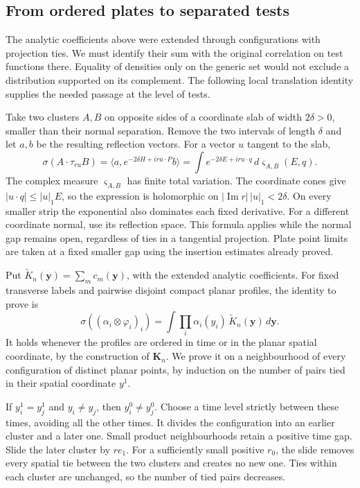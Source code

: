 \documentclass[11pt,letterpaper,reqno]{amsart}
\theoremstyle{definition}
\theoremstyle{remark}
\begin{document}
\subsection{From ordered plates to separated tests}

The analytic coefficients above were extended through configurations
with projection ties. We must identify their sum with the original
correlation on test functions there. Equality of densities only on
the generic set would not exclude a distribution supported on its
complement. The following local translation identity supplies the
needed passage at the level of tests.

Take two clusters $A,B$ on opposite sides of a coordinate slab of
width $2\delta>0$, smaller than their normal separation. Remove the
two intervals of length $\delta$ and let $a,b$ be the resulting
reflection vectors. For a vector $u$ tangent to the slab,
\begin{equation}\label{eq:expanded-slab-sliding}
 \sigma(A\cdot\tau_{ru}B)
 =\langle a,e^{-2\delta H+iru\cdot P}b\rangle
 =\int e^{-2\delta E+iru\cdot q}
                                \,d\varsigma_{A,B}(E,q).
\end{equation}
The complex measure $\varsigma_{A,B}$ has finite total variation.
The coordinate cones give $|u\cdot q|\le |u|_1E$, so the expression
is holomorphic on $|\operatorname{Im}r|\,|u|_1<2\delta$. On every
smaller strip the exponential also dominates each fixed derivative.
For a different coordinate normal, use its reflection space.
This formula applies while the normal gap remains open, regardless
of ties in a tangential projection. Plate point limits are taken at
a fixed smaller gap using the insertion estimates already proved.

Put $\widetilde K_n(\mathbf y)=\sum_m c_m(\mathbf y)$, with the
extended analytic coefficients. For fixed transverse labels and
pairwise disjoint compact planar profiles, the identity to prove is
\[
 \sigma((\alpha_i\otimes\varphi_i)_i)
   =\int\prod_i\alpha_i(y_i)\,
                         \widetilde K_n(\mathbf y)\,d\mathbf y.
\]
It holds whenever the profiles are ordered in time or in the planar
spatial coordinate, by the construction of $\mathbf K_n$. We prove
it on a neighbourhood of every configuration of distinct planar
points, by induction on the number of pairs tied in their spatial
coordinate $y^1$.

If $y_i^1=y_j^1$ and $y_i\ne y_j$, then $y_i^0\ne y_j^0$.
Choose a time level strictly between these times, avoiding all the
other times. It divides the configuration into an earlier cluster
and a later one. Small product neighbourhoods retain a positive
time gap. Slide the later cluster by $re_1$. For a sufficiently
small positive $r_0$, the slide removes every spatial tie between
the two clusters and creates no new one. Ties within each cluster
are unchanged, so the number of tied pairs decreases.
\end{document}
